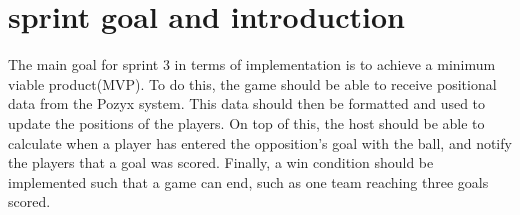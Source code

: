 \section{sprint goal and introduction}
The main goal for sprint 3 in terms of implementation is to achieve a minimum viable product(MVP).
To do this, the game should be able to receive positional data from the Pozyx system.
This data should then be formatted and used to update the positions of the players.
On top of this, the host should be able to calculate when a player has entered the opposition's goal with the ball, and notify the players that a goal was scored.
Finally, a win condition should be implemented such that a game can end, such as one team reaching three goals scored.
